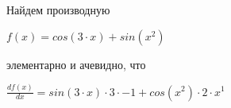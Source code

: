 \documentclass[12pt,a4paper]{scrartcl}
\begin{document}
Найдем производную \vspace{0.5cm}

$f(x) = cos(3\cdot x)+sin(x^2)$\vspace{0.5cm}

элементарно и ачевидно, что\vspace{0.5cm}

 $\frac{df(x)}{dx} = sin(3\cdot x)\cdot 3\cdot -1+cos(x^2)\cdot 2\cdot x^1$
\end{document}
